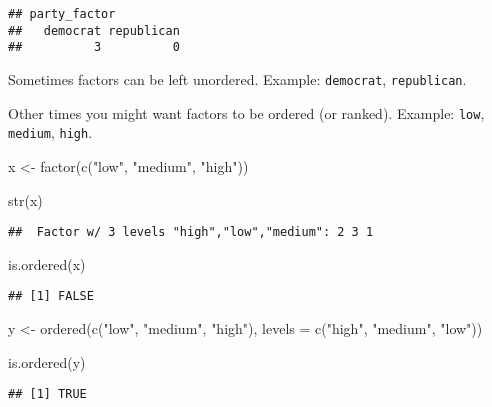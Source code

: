 \documentclass[
]{book}
\newenvironment{Shaded}{\begin{snugshade}}{\end{snugshade}}
\newcommand{\AttributeTok}[1]{\textcolor[rgb]{0.77,0.63,0.00}{#1}}
\newcommand{\FunctionTok}[1]{\textcolor[rgb]{0.00,0.00,0.00}{#1}}
\newcommand{\NormalTok}[1]{#1}
\newcommand{\OtherTok}[1]{\textcolor[rgb]{0.56,0.35,0.01}{#1}}
\newcommand{\StringTok}[1]{\textcolor[rgb]{0.31,0.60,0.02}{#1}}
\begin{document}
\begin{verbatim}
## party_factor
##   democrat republican 
##          3          0
\end{verbatim}

Sometimes factors can be left unordered. Example: \texttt{democrat}, \texttt{republican}.

Other times you might want factors to be ordered (or ranked). Example: \texttt{low}, \texttt{medium}, \texttt{high}.

\begin{Shaded}
\begin{Highlighting}[]
\NormalTok{x }\OtherTok{\textless{}{-}} \FunctionTok{factor}\NormalTok{(}\FunctionTok{c}\NormalTok{(}\StringTok{"low"}\NormalTok{, }\StringTok{"medium"}\NormalTok{, }\StringTok{"high"}\NormalTok{))}

\FunctionTok{str}\NormalTok{(x)}
\end{Highlighting}
\end{Shaded}

\begin{verbatim}
##  Factor w/ 3 levels "high","low","medium": 2 3 1
\end{verbatim}

\begin{Shaded}
\begin{Highlighting}[]
\FunctionTok{is.ordered}\NormalTok{(x)}
\end{Highlighting}
\end{Shaded}

\begin{verbatim}
## [1] FALSE
\end{verbatim}

\begin{Shaded}
\begin{Highlighting}[]
\NormalTok{y }\OtherTok{\textless{}{-}} \FunctionTok{ordered}\NormalTok{(}\FunctionTok{c}\NormalTok{(}\StringTok{"low"}\NormalTok{, }\StringTok{"medium"}\NormalTok{, }\StringTok{"high"}\NormalTok{), }\AttributeTok{levels =} \FunctionTok{c}\NormalTok{(}\StringTok{"high"}\NormalTok{, }\StringTok{"medium"}\NormalTok{, }\StringTok{"low"}\NormalTok{))}

\FunctionTok{is.ordered}\NormalTok{(y)}
\end{Highlighting}
\end{Shaded}

\begin{verbatim}
## [1] TRUE
\end{verbatim}
\end{document}
